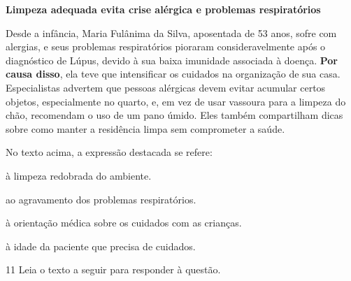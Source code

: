 \begin{myquote}

\textbf{Limpeza adequada evita crise alérgica e problemas
respiratórios}

Desde a infância, Maria Fulânima da Silva, aposentada de 53 anos, sofre com alergias, e
seus problemas respiratórios pioraram consideravelmente após o diagnóstico de
Lúpus, devido à sua baixa imunidade associada à doença. \textbf{Por causa disso}, ela
teve que intensificar os cuidados na organização de sua casa. Especialistas
advertem que pessoas alérgicas devem evitar acumular certos objetos,
especialmente no quarto, e, em vez de usar vassoura para a limpeza do chão,
recomendam o uso de um pano úmido. Eles também compartilham dicas sobre como
manter a residência limpa sem comprometer a saúde.


\end{myquote}

No texto acima, a expressão destacada se refere:

\begin{escolha}
  
  \item à limpeza redobrada do ambiente.
  
  \item ao agravamento dos problemas respiratórios.
  
  \item à orientação médica sobre os cuidados com as crianças.
  
  \item à idade da paciente que precisa de cuidados.

\end{escolha}

\num{11} Leia o texto a seguir para responder à questão.

